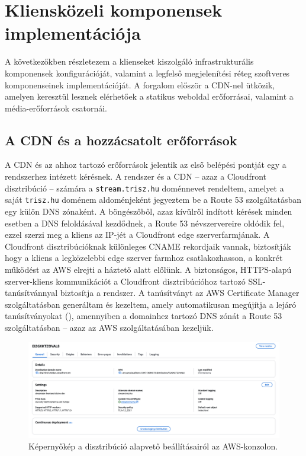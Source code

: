 \chapter{Kliensközeli komponensek implementációja}

A következőkben részletezem a klienseket kiszolgáló infrastrukturális komponensek konfigurációját, valamint a legfelső megjelenítési réteg szoftveres komponenseinek implementációját. A forgalom először a CDN-nel ütközik, amelyen keresztül lesznek elérhetőek a statikus weboldal erőforrásai, valamint a média-erőforrások csatornái.

\section{A CDN és a hozzácsatolt erőforrások}

A CDN és az ahhoz tartozó erőforrások jelentik az első belépési pontját egy a rendszerhez intézett kérésnek. A rendszer és a CDN -- azaz a Cloudfront disztribúció -- számára a \verb|stream.trisz.hu| doménnevet rendeltem, amelyet a saját \verb|trisz.hu| doménem aldoménjeként jegyeztem be a Route 53 szolgáltatásban egy külön DNS zónaként. A böngészőből, azaz kívülről indított kérések minden esetben a DNS feloldásával kezdődnek, a Route 53 névszervereire oldódik fel, ezzel szerzi meg a kliens az IP-jét a Cloudfront edge szerverfarmjának. A Cloudfront disztribúcióknak különleges CNAME rekordjaik vannak, biztosítják hogy a kliens a legközelebbi edge szerver farmhoz csatlakozhasson, a konkrét működést az AWS elrejti a háztető alatt előlünk. A biztonságos, HTTPS-alapú szerver-kliens kommunikációt a Cloudfront disztribúcióhoz tartozó SSL-tanúsítvánnyal biztosítja a rendszer. A tanúsítványt az AWS Certificate Manager szolgáltatásban generáltam és kezeltem, amely automatikusan megújítja a lejáró tanúsítványokat (), amennyiben a domainhez tartozó DNS zónát a Route 53 szolgáltatásban -- azaz az AWS szolgáltatásában kezeljük.

\begin{figure}[ht]
  \centering
  \includegraphics[width=150mm, keepaspectratio]{figures/distro_main.png}
  \caption{Képernyőkép a disztribúció alapvető beállításairól az AWS-konzolon.}
  \label{fig:distro}
\end{figure}

